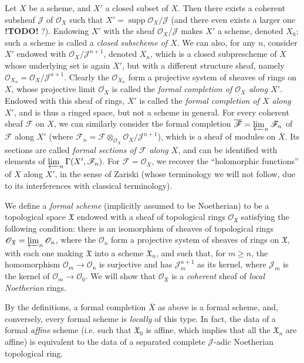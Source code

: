 \documentclass{article}
\theoremstyle{plain}
\theoremstyle{definition}
\newcommand{\sh}{\mathscr}
\newcommand{\fk}{\mathfrak}
\renewcommand{\geq}{\geqslant}
\DeclareMathOperator{\supp}{supp}
\newcommand{\todo}{\textbf{ !TODO! }}
\newcommand{\oldpage}[1]{\marginpar{\footnotesize$\Big\vert$ \textit{p.~#1}}}
\begin{document}
Let $X$ be a scheme, and $X'$ a closed subset of $X$.
Then there exists a coherent subsheaf $\sh{J}$ of $\sh{O}_X$ such that $X'=\supp\sh{O}_X/\sh{J}$ (and there even exists a larger one \todo?).
Endowing $X'$ with the sheaf $\sh{O}_X/\sh{J}$ makes $X'$ a scheme, denoted $X_0$;
such a scheme is called a \emph{closed subscheme of $X$}.
We can also, for any $n$, consider $X'$ endowed with $\sh{O}_X/\sh{J}^{n+1}$, denoted $X_n$, which is a closed subprescheme of $X$ whose underlying set is again $X'$, but with a different structure sheaf, namely $\sh{O}_{X_n}=\sh{O}_X/\sh{J}^{n+1}$.
Clearly the $\sh{O}_{X_n}$ form a projective system of sheaves of rings on $X$, whose projective limit $\overline{\sh{O}_X}$ is called the \emph{formal completion of $\sh{O}_X$ along $X'$}.
Endowed with this sheaf of rings, $X'$ is called the \emph{formal completion of $X$ along $X'$}, and is thus a ringed space, but not a scheme in general.
For every coherent sheaf $\sh{F}$ on $X$, we can similarly consider the formal completion $\overline{\sh{F}}=\varprojlim_n\sh{F}_n$ of $\sh{F}$ along $X'$ (where $\sh{F}_n=\sh{F}\otimes_{\sh{O}_X}\sh{O}_X/\sh{J}^{n+1}$), which is a sheaf of modules on $\overline{X}$.
Its sections are called \emph{formal sections of $\sh{F}$ along $X$}, and can be identified with elements of $\varprojlim_n\Gamma(X',\sh{F}_n)$.
For $\sh{F}=\sh{O}_X$, we recover the ``holomorphic functions'' of $X$ along $X'$, in the sense of Zariski (whose terminology we will not follow, due to its interferences with classical terminology).

We define a \emph{formal scheme} (implicitly assumed to be Noetherian) to be a topological space $\fk{X}$ endowed with a sheaf of topological rings $\sh{O}_{\fk{X}}$ satisfying the following condition:
there is an isomorphism of sheaves of topological rings $\sh{O}_{\fk{X}}=\varprojlim_n\sh{O}_n$, where the $\sh{O}_n$ form a projective system of sheaves of rings on $\fk{X}$, with each one making $\fk{X}$ into a scheme $\fk{X}_n$, and such that, for $m\geq n$, the homomorphism $\sh{O}_m\to\sh{O}_n$ is surjective and has $\sh{J}_m^{n+1}$ as its kernel, where $\sh{J}_m$ is
\oldpage{182-04}
the kernel of $\sh{O}_m\to\sh{O}_0$.
We will show that $\sh{O}_{\fk{X}}$ is a \emph{coherent} sheaf of \emph{local Noetherian} rings.

By the definitions, a formal completion $\overline{X}$ as above is a formal scheme, and, conversely, every formal scheme is \emph{locally} of this type.
In fact, the data of a formal \emph{affine} scheme (i.e. such that $\fk{X}_0$ is affine, which implies that all the $\fk{X}_n$ are affine) is equivalent to the data of a separated complete $\sh{J}$-adic Noetherian topological ring.
\end{document}
